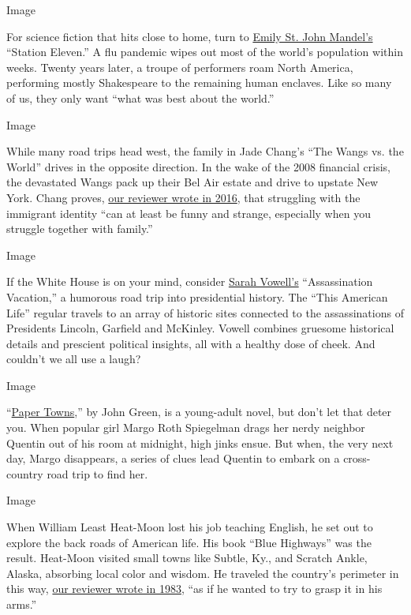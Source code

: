 Image

For science fiction that hits close to home, turn to
\href{https://www.nytimes3xbfgragh.onion/2014/09/14/books/review/station-eleven-by-emily-st-john-mandel.html}{Emily
St. John Mandel's} ``Station Eleven.'' A flu pandemic wipes out most of
the world's population within weeks. Twenty years later, a troupe of
performers roam North America, performing mostly Shakespeare to the
remaining human enclaves. Like so many of us, they only want ``what was
best about the world.''

Image

While many road trips head west, the family in Jade Chang's ``The Wangs
vs. the World'' drives in the opposite direction. In the wake of the
2008 financial crisis, the devastated Wangs pack up their Bel Air estate
and drive to upstate New York. Chang proves,
\href{https://www.nytimes3xbfgragh.onion/2016/10/16/books/review/wangs-vs-the-world-jade-chang.html}{our
reviewer wrote in 2016}, that struggling with the immigrant identity
``can at least be funny and strange, especially when you struggle
together with family.''

Image

If the White House is on your mind, consider
\href{https://www.nytimes3xbfgragh.onion/2005/05/08/books/review/assassination-vacation-dead-presidents.html}{Sarah
Vowell's} ``Assassination Vacation,'' a humorous road trip into
presidential history. The ``This American Life'' regular travels to an
array of historic sites connected to the assassinations of Presidents
Lincoln, Garfield and McKinley. Vowell combines gruesome historical
details and prescient political insights, all with a healthy dose of
cheek. And couldn't we all use a laugh?

Image

``\href{https://www.nytimes3xbfgragh.onion/2008/12/07/books/review/Sutton2-t.html}{Paper
Towns},'' by John Green, is a young-adult novel, but don't let that
deter you. When popular girl Margo Roth Spiegelman drags her nerdy
neighbor Quentin out of his room at midnight, high jinks ensue. But
when, the very next day, Margo disappears, a series of clues lead
Quentin to embark on a cross-country road trip to find her.

Image

When William Least Heat-Moon lost his job teaching English, he set out
to explore the back roads of American life. His book ``Blue Highways''
was the result. Heat-Moon visited small towns like Subtle, Ky., and
Scratch Ankle, Alaska, absorbing local color and wisdom. He traveled the
country's perimeter in this way,
\href{https://www.nytimes3xbfgragh.onion/1983/01/13/books/books-of-the-times-159989.html}{our
reviewer wrote in 1983}, ``as if he wanted to try to grasp it in his
arms.''

